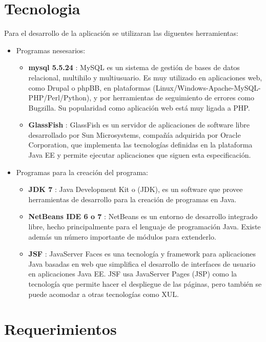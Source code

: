 \documentclass[12pt]{article}
\begin{document}
\section{Tecnologia}
Para el desarrollo de la aplicaci\'on se utilizaran las diguentes herramientas:
\begin{itemize}
\item
Programas nesesarios:
\begin{itemize}
\item
\textbf{mysql 5.5.24} : MySQL es un sistema de gesti\'on de bases de datos relacional, multihilo y multiusuario. Es muy utilizado en aplicaciones web, como Drupal o phpBB, en plataformas (Linux/Windows-Apache-MySQL-PHP/Perl/Python), y por herramientas de seguimiento de errores como Bugzilla. Su popularidad como aplicaci\'on web est\'a muy ligada a PHP.\\
\item
\textbf{GlassFish} : GlassFish es un servidor de aplicaciones de software libre desarrollado por Sun Microsystems, compañía adquirida por Oracle Corporation, que implementa las tecnologías definidas en la plataforma Java EE y permite ejecutar aplicaciones que siguen esta especificación. \\
\end{itemize}
\item
Programas para la creaci\'on del programa:
\begin{itemize}
\item
\textbf{JDK 7} : Java Development Kit o (JDK), es un software que provee herramientas de desarrollo para la creaci\'on de programas en Java.\\
\item
\textbf{NetBeans IDE 6 o 7} : NetBeans es un entorno de desarrollo integrado libre, hecho principalmente para el lenguaje de programaci\'on Java. Existe adem\'as un n\'umero importante de m\'odulos para extenderlo.\\
\item
\textbf{JSF} : JavaServer Faces es una tecnología y framework para aplicaciones Java basadas en web que simplifica el desarrollo de interfaces de usuario en aplicaciones Java EE. JSF usa JavaServer Pages (JSP) como la tecnología que permite hacer el despliegue de las páginas, pero también se puede acomodar a otras tecnologías como XUL.
\end{itemize}
\end{itemize}

\section{\textbf{Requerimientos}}
\end{document}
